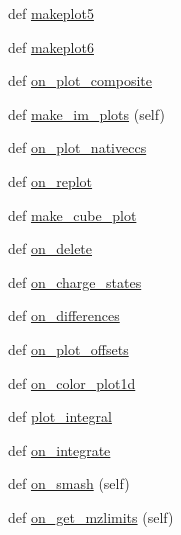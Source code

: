 \begin{DoxyCompactItemize}
def \hyperlink{class_uni_dec_1_1_g_uni_dec_1_1_uni_dec_app_ac224a74a698b3844f578ffe240fc8f8d}{makeplot5}
\item 
def \hyperlink{class_uni_dec_1_1_g_uni_dec_1_1_uni_dec_app_aa77986a59a171850595dc4d2636203c1}{makeplot6}
\item 
def \hyperlink{class_uni_dec_1_1_g_uni_dec_1_1_uni_dec_app_abcf7e80630a45cef9abfe66ce9a06727}{on\+\_\+plot\+\_\+composite}
\item 
def \hyperlink{class_uni_dec_1_1_g_uni_dec_1_1_uni_dec_app_ad23bf7755ca52368d7e5c5ffb3527d6d}{make\+\_\+im\+\_\+plots} (self)
\item 
def \hyperlink{class_uni_dec_1_1_g_uni_dec_1_1_uni_dec_app_ac22963703b88fc808886877fe5e3d326}{on\+\_\+plot\+\_\+nativeccs}
\item 
def \hyperlink{class_uni_dec_1_1_g_uni_dec_1_1_uni_dec_app_a55d99c7a61b0e58484b7efd12fb536e5}{on\+\_\+replot}
\item 
def \hyperlink{class_uni_dec_1_1_g_uni_dec_1_1_uni_dec_app_ae3e59e695d4511bc8fe8e932caeaf512}{make\+\_\+cube\+\_\+plot}
\item 
def \hyperlink{class_uni_dec_1_1_g_uni_dec_1_1_uni_dec_app_affe1ff3c2875fb8c5e460527885d23dd}{on\+\_\+delete}
\item 
def \hyperlink{class_uni_dec_1_1_g_uni_dec_1_1_uni_dec_app_afb56d3e2337f011e529fd1193eb08f64}{on\+\_\+charge\+\_\+states}
\item 
def \hyperlink{class_uni_dec_1_1_g_uni_dec_1_1_uni_dec_app_a3b2bf2856dc2eaa44933156a0872554f}{on\+\_\+differences}
\item 
def \hyperlink{class_uni_dec_1_1_g_uni_dec_1_1_uni_dec_app_ad3aaba052162cc297a6f86e0b003569d}{on\+\_\+plot\+\_\+offsets}
\item 
def \hyperlink{class_uni_dec_1_1_g_uni_dec_1_1_uni_dec_app_a9c46256d45a5bd2488213d4675c63f19}{on\+\_\+color\+\_\+plot1d}
\item 
def \hyperlink{class_uni_dec_1_1_g_uni_dec_1_1_uni_dec_app_aa062ebff4dd0a6017623393161e6deb6}{plot\+\_\+integral}
\item 
def \hyperlink{class_uni_dec_1_1_g_uni_dec_1_1_uni_dec_app_a7cb4afa78860fb3e7a877591453a77ce}{on\+\_\+integrate}
\item 
def \hyperlink{class_uni_dec_1_1_g_uni_dec_1_1_uni_dec_app_a665a9e1ff2edcdccd09c8a680c886871}{on\+\_\+smash} (self)
\item 
def \hyperlink{class_uni_dec_1_1_g_uni_dec_1_1_uni_dec_app_aa6fdd5b6b911f18731d3150a4c7cba67}{on\+\_\+get\+\_\+mzlimits} (self)
\item 

\end{DoxyCompactItemize}
